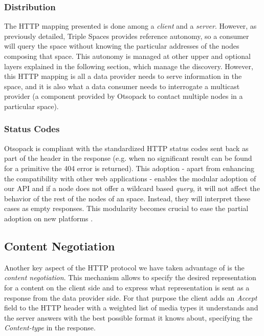 \subsubsection{Distribution}

The HTTP mapping presented is done among a \textit{client} and a \textit{server}.
However, as previously detailed, Triple Spaces provides reference autonomy, so a consumer will query the space without knowing the particular addresses of the nodes composing that space.
This autonomy is managed at other upper and optional layers explained in the following section, which manage the discovery.
However, this HTTP mapping is all a data provider needs to serve information in the space, and it is also what a data consumer needs to interrogate a multicast provider (a component provided by Otsopack to contact multiple nodes in a particular space).

\subsubsection{Status Codes}
Otsopack is compliant with the standardized HTTP status codes sent back as part of the header in the response (e.g. when no significant result can be found for a primitive the 404 error is returned).
This adoption - apart from enhancing the compatibility with other web applications - enables the modular adoption of our API and if a node does not offer a wildcard based \textit{query}, it will not affect the behavior of the rest of the nodes of an space.
Instead, they will interpret these cases as empty responses.
This modularity becomes crucial to ease the partial adoption on new platforms \citep{gomez-goiri_collaboration_2011}.

\subsection{Content Negotiation}
Another key aspect of the HTTP protocol we have taken advantage of is the \textit{content negotiation}.
This mechanism allows to specify the desired representation for a content on the client side and to express what representation is sent as a response from the data provider side.
For that purpose the client adds an \textit{Accept} field to the HTTP header with a weighted list of media types it understands and the server answers with the best possible format it knows about, specifying the \textit{Content-type} in the response.

